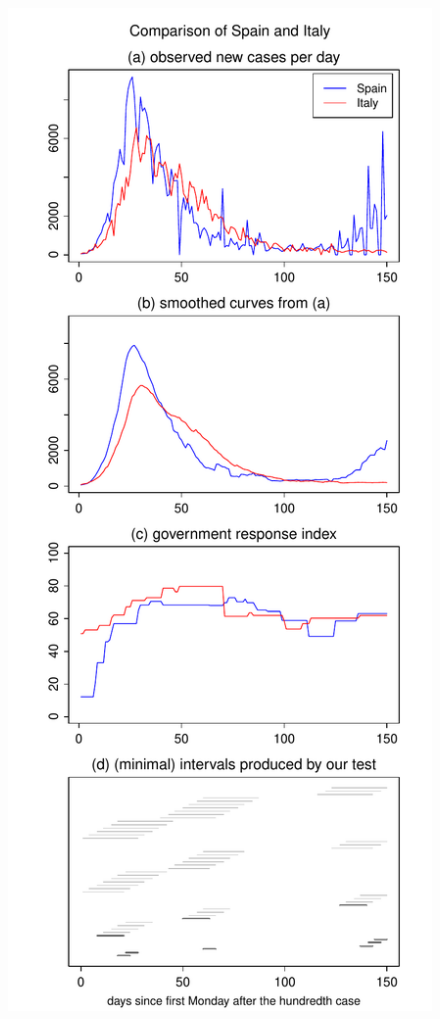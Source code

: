 \documentclass[a4paper,12pt]{article}
\numberwithin{equation}{section}
\begin{document}
{\begin{figure}[p!]
\begin{minipage}[t]{0.49\textwidth}
\includegraphics[width=\textwidth]{plots/ESP_vs_ITA_wa}

\end{minipage}
\end{figure}}
\end{document}
